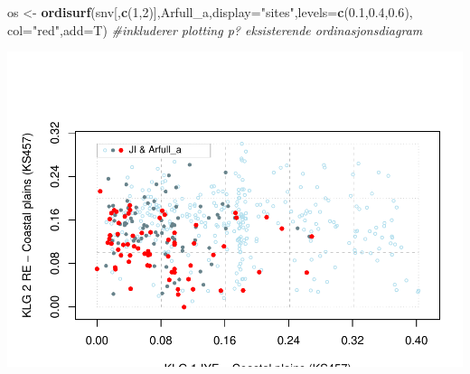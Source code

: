 \documentclass[]{article}
\newenvironment{Shaded}{\begin{snugshade}}{\end{snugshade}}
\newcommand{\CommentTok}[1]{\textcolor[rgb]{0.56,0.35,0.01}{\textit{#1}}}
\newcommand{\DataTypeTok}[1]{\textcolor[rgb]{0.13,0.29,0.53}{#1}}
\newcommand{\DecValTok}[1]{\textcolor[rgb]{0.00,0.00,0.81}{#1}}
\newcommand{\FloatTok}[1]{\textcolor[rgb]{0.00,0.00,0.81}{#1}}
\newcommand{\KeywordTok}[1]{\textcolor[rgb]{0.13,0.29,0.53}{\textbf{#1}}}
\newcommand{\NormalTok}[1]{#1}
\newcommand{\StringTok}[1]{\textcolor[rgb]{0.31,0.60,0.02}{#1}}
\begin{document}
\begin{Shaded}
\begin{Highlighting}[]
\NormalTok{os <-}\StringTok{ }\KeywordTok{ordisurf}\NormalTok{(snv[,}\KeywordTok{c}\NormalTok{(}\DecValTok{1}\NormalTok{,}\DecValTok{2}\NormalTok{)],Arfull_a,}\DataTypeTok{display=}\StringTok{"sites"}\NormalTok{,}\DataTypeTok{levels=}\KeywordTok{c}\NormalTok{(}\FloatTok{0.1}\NormalTok{,}\FloatTok{0.4}\NormalTok{,}\FloatTok{0.6}\NormalTok{), }\DataTypeTok{col=}\StringTok{"red"}\NormalTok{,}\DataTypeTok{add=}\NormalTok{T) }\CommentTok{#inkluderer plotting p? eksisterende ordinasjonsdiagram}
\end{Highlighting}
\end{Shaded}

\includegraphics{Landscape_analysis_example_4_files/figure-latex/unnamed-chunk-44-1.pdf}
\end{document}
